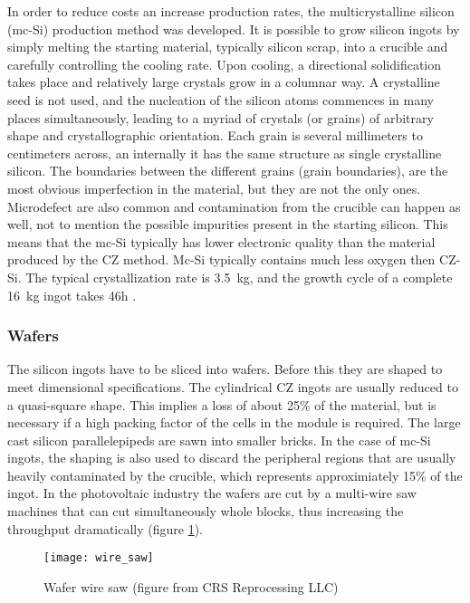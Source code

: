 In order to reduce costs an increase production rates, the multicrystalline silicon (mc-Si) production method was developed. It is possible to grow silicon ingots by simply melting the starting material, typically silicon scrap, into a crucible and carefully controlling the cooling rate. Upon cooling, a directional solidification takes place and relatively large crystals grow in a columnar way. A crystalline seed is not used, and the nucleation of the silicon atoms commences in many places simultaneously, leading to a myriad of crystals (or grains) of arbitrary shape and crystallographic orientation. Each grain is several millimeters to centimeters across, an internally it has the same structure as single crystalline silicon. The boundaries between the different grains (grain boundaries), are the most obvious imperfection in the material, but they are not the only ones. Microdefect are also common and contamination from the crucible can happen as well, not to mention the possible impurities present in the starting silicon. This means that the mc-Si typically has lower electronic quality than the material produced by the CZ method. Mc-Si typically contains much less oxygen then CZ-Si. The typical crystallization rate is 3.5~kg, and the growth cycle of a complete 16~kg ingot takes 46h \cite{solar_cells}. 

\subsubsection{Wafers}

The silicon ingots have to be sliced into wafers. Before this they are shaped to meet dimensional specifications. The cylindrical CZ ingots are usually reduced to a quasi-square shape. This implies a loss of about 25\% of the material, but is necessary if a high packing factor of the cells in the module is required. The large cast silicon parallelepipeds are sawn into smaller bricks. In the case of mc-Si ingots, the shaping is also used to discard the peripheral regions that are usually heavily contaminated by the crucible, which represents approximiately 15\% of the ingot. In the photovoltaic industry the wafers are cut by a multi-wire saw machines that can cut simultaneously whole blocks, thus increasing the throughput dramatically (figure \ref{fig:wire_saw}).

\begin{figure}%
\texttt{[image: wire\_saw]}%
\caption{Wafer wire saw (figure from CRS Reprocessing LLC)}%
\label{fig:wire_saw}%
\end{figure}

